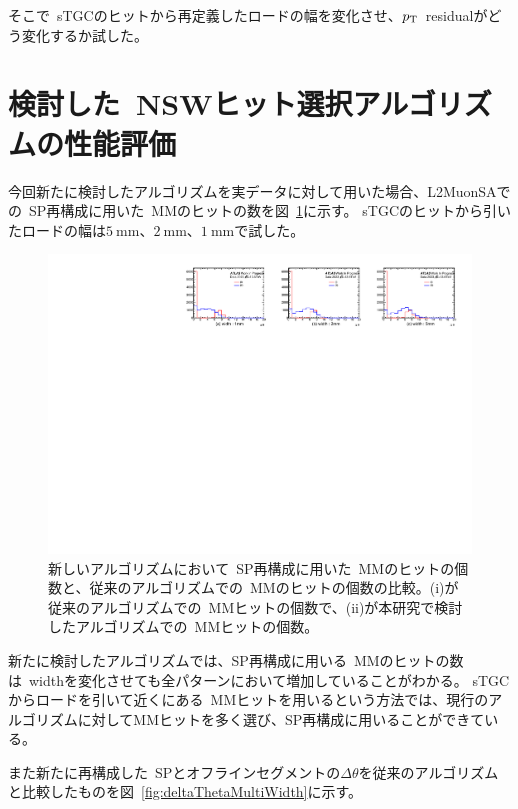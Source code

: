 そこで~sTGCのヒットから再定義したロードの幅を変化させ、$p_\mathrm{T}$~residualがどう変化するか試した。


\section{検討した~NSWヒット選択アルゴリズムの性能評価}\label{chapter5-5}
今回新たに検討したアルゴリズムを実データに対して用いた場合、L2MuonSAでの~SP再構成に用いた~MMのヒットの数を図~\ref{fig:numOfHitMultiWidth}に示す。
sTGCのヒットから引いたロードの幅は$\SI{5}{\mm}$、$\SI{2}{\mm}$、$\SI{1}{\mm}$で試した。

\begin{figure}[h]
    \centering
    \includegraphics[clip, width=14cm]{fig/5/numOfMMHit_multiWidth.pdf}
    \caption{新しいアルゴリズムにおいて~SP再構成に用いた~MMのヒットの個数と、従来のアルゴリズムでの~MMのヒットの個数の比較。(i)が従来のアルゴリズムでの~MMヒットの個数で、(ii)が本研究で検討したアルゴリズムでの~MMヒットの個数。}
    \label{fig:numOfHitMultiWidth}
\end{figure}

新たに検討したアルゴリズムでは、SP再構成に用いる~MMのヒットの数は~widthを変化させても全パターンにおいて増加していることがわかる。
sTGCからロードを引いて近くにある~MMヒットを用いるという方法では、現行のアルゴリズムに対してMMヒットを多く選び、SP再構成に用いることができている。

また新たに再構成した~SPとオフラインセグメントの$\Delta \theta$を従来のアルゴリズムと比較したものを図~\ref{fig:deltaThetaMultiWidth}に示す。

